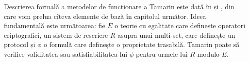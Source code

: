 Descrierea formală a metodelor de funcționare a Tamarin este dată
în \cite{schmidt} și \cite{meier}, din care vom prelua cîteva elemente
de bază în capitolul următor. Ideea fundamentală este următoarea:
fie $ E $ o teorie cu egalitate care definește operatori criptografici,
un sistem de rescriere $ R $ asupra unui multi-set, care definește un
protocol și $ \phi $ o formulă care definește o proprietate trasabilă.
Tamarin poate să verifice validitatea sau satisfiabilitatea lui $ \phi $
pentru urmele lui $ R $ modulo $ E $.

